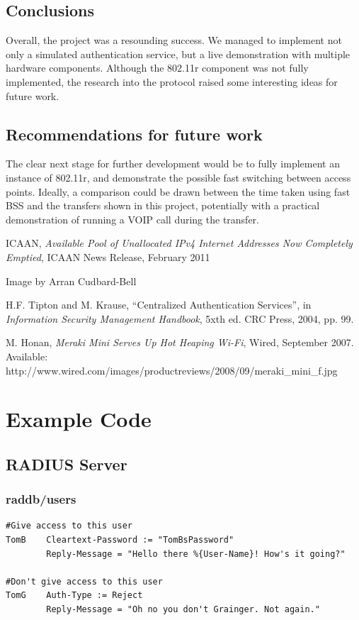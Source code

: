 \documentclass[12pt,a4paper,titlepage]{article}
\begin{document}
\subsection{Conclusions}
Overall, the project was a resounding success. We managed to implement not only a simulated authentication service, but a live demonstration with multiple hardware components. Although the 802.11r component was not fully implemented, the research into the protocol raised some interesting ideas for future work.

\subsection{Recommendations for future work}
The clear next stage for further development would be to fully implement an instance of 802.11r, and demonstrate the possible fast switching between access points. Ideally, a comparison could be drawn between the time taken using fast BSS and the transfers shown in this project, potentially with a practical demonstration of running a VOIP call during the transfer.

\newpage
\begin{thebibliography}{99}

 ICAAN, \textit{Available Pool of Unallocated IPv4 Internet Addresses Now Completely Emptied}, ICAAN News Release, February 2011

 Image by Arran Cudbard-Bell

H.F. Tipton and M. Krause, ``Centralized Authentication Services'', in \textit{Information Security Management Handbook}, 5xth ed. CRC Press, 2004, pp. 99.

M. Honan, \textit{Meraki Mini Serves Up Hot Heaping Wi-Fi}, Wired, September 2007. Available: http://www.wired.com/images/productreviews/2008/09/meraki\_mini\_f.jpg

\end{thebibliography}

\newpage
\appendix
\section{Example Code}

\subsection{RADIUS Server}
\label{sec:Code;sub:radius}

\subsubsection{raddb/users}
\begin{Verbatim}[frame=single]
#Give access to this user
TomB    Cleartext-Password := "TomBsPassword"
        Reply-Message = "Hello there %{User-Name}! How's it going?"

#Don't give access to this user
TomG    Auth-Type := Reject
        Reply-Message = "Oh no you don't Grainger. Not again."
\end{Verbatim}
\end{document}
